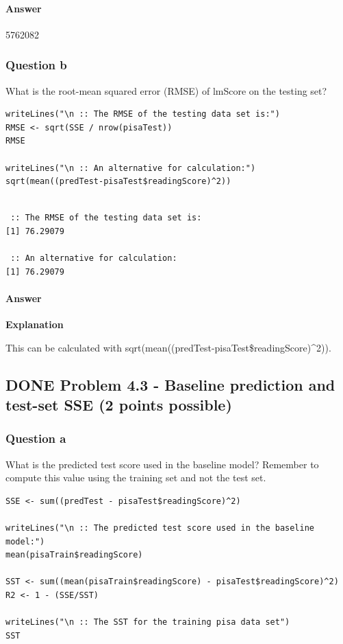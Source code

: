 \documentclass[letterpaper, 9pt, onecolumn, twoside, technote, final]{IEEEtran}
\begin{document}
\paragraph{Answer}
\label{sec-2-14-1-1}

5762082

\subsubsection{Question b}
\label{sec-2-14-2}

What is the root-mean squared error (RMSE) of lmScore on the testing
set?

\begin{verbatim}
writeLines("\n :: The RMSE of the testing data set is:")
RMSE <- sqrt(SSE / nrow(pisaTest))
RMSE

writeLines("\n :: An alternative for calculation:")
sqrt(mean((predTest-pisaTest$readingScore)^2))
\end{verbatim}

\begin{verbatim}

 :: The RMSE of the testing data set is:
[1] 76.29079

 :: An alternative for calculation:
[1] 76.29079
\end{verbatim}

\paragraph{Answer}
\label{sec-2-14-2-1}

\textbf{Explanation}

This can be calculated with
sqrt(mean((predTest-pisaTest\$readingScore)\^{}2)).

\subsection{{\bfseries\sffamily DONE} Problem 4.3 - Baseline prediction and test-set SSE (2 points possible)}
\label{sec-2-15}

\subsubsection{Question a}
\label{sec-2-15-1}

What is the predicted test score used in the baseline model? Remember
to compute this value using the training set and not the test set.

\begin{verbatim}
SSE <- sum((predTest - pisaTest$readingScore)^2)

writeLines("\n :: The predicted test score used in the baseline model:")
mean(pisaTrain$readingScore)

SST <- sum((mean(pisaTrain$readingScore) - pisaTest$readingScore)^2)
R2 <- 1 - (SSE/SST)

writeLines("\n :: The SST for the training pisa data set")
SST
\end{verbatim}
\end{document}
